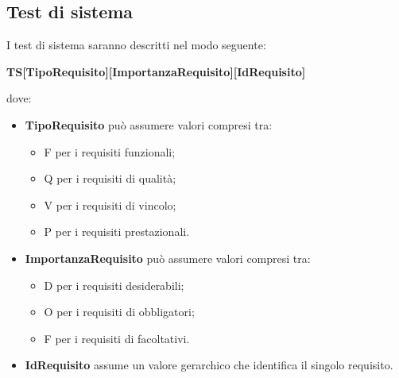 \documentclass[../PianoDiQualifica_v3.0.0.tex]{subfiles}
\begin{document}
	\subsection{Test di sistema}
	I test di sistema saranno descritti nel modo seguente:
	\begin{center}
		\textbf{TS[TipoRequisito][ImportanzaRequisito][IdRequisito]}
	\end{center}
	dove:
	\begin{itemize}
		\item \textbf{TipoRequisito} può assumere valori compresi tra:
		\begin{itemize}
			\item F per i requisiti funzionali;
			\item Q per i requisiti di qualità;
			\item V per i requisiti di vincolo;
			\item P per i requisiti prestazionali.
		\end{itemize}
		\item \textbf{ImportanzaRequisito} può assumere valori compresi tra:
		\begin{itemize}
			\item D per i requisiti desiderabili;
			\item O per i requisiti di obbligatori;
			\item F per i requisiti di facoltativi.
		\end{itemize}
		\item \textbf{IdRequisito} assume un valore gerarchico che identifica il singolo requisito.
	\end{itemize}
\end{document}

